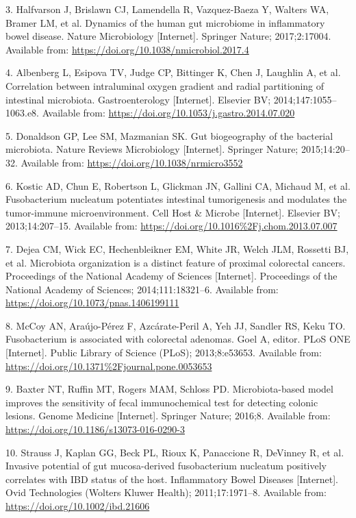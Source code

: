 \documentclass[12pt,]{article}
\begin{document}
\hypertarget{ref-Halfvarson2017}{}
3. Halfvarson J, Brislawn CJ, Lamendella R, Vazquez-Baeza Y, Walters WA,
Bramer LM, et al. Dynamics of the human gut microbiome in inflammatory
bowel disease. Nature Microbiology {[}Internet{]}. Springer Nature;
2017;2:17004. Available from:
\url{https://doi.org/10.1038/nmicrobiol.2017.4}

\hypertarget{ref-Albenberg2014}{}
4. Albenberg L, Esipova TV, Judge CP, Bittinger K, Chen J, Laughlin A,
et al. Correlation between intraluminal oxygen gradient and radial
partitioning of intestinal microbiota. Gastroenterology {[}Internet{]}.
Elsevier BV; 2014;147:1055--1063.e8. Available from:
\url{https://doi.org/10.1053/j.gastro.2014.07.020}

\hypertarget{ref-Donaldson2015}{}
5. Donaldson GP, Lee SM, Mazmanian SK. Gut biogeography of the bacterial
microbiota. Nature Reviews Microbiology {[}Internet{]}. Springer Nature;
2015;14:20--32. Available from:
\url{https://doi.org/10.1038/nrmicro3552}

\hypertarget{ref-Kostic_2013}{}
6. Kostic AD, Chun E, Robertson L, Glickman JN, Gallini CA, Michaud M,
et al. Fusobacterium nucleatum potentiates intestinal tumorigenesis and
modulates the tumor-immune microenvironment. Cell Host \& Microbe
{[}Internet{]}. Elsevier BV; 2013;14:207--15. Available from:
\url{https://doi.org/10.1016\%2Fj.chom.2013.07.007}

\hypertarget{ref-Dejea2014}{}
7. Dejea CM, Wick EC, Hechenbleikner EM, White JR, Welch JLM, Rossetti
BJ, et al. Microbiota organization is a distinct feature of proximal
colorectal cancers. Proceedings of the National Academy of Sciences
{[}Internet{]}. Proceedings of the National Academy of Sciences;
2014;111:18321--6. Available from:
\url{https://doi.org/10.1073/pnas.1406199111}

\hypertarget{ref-McCoy_2013}{}
8. McCoy AN, Araújo-Pérez F, Azcárate-Peril A, Yeh JJ, Sandler RS, Keku
TO. Fusobacterium is associated with colorectal adenomas. Goel A,
editor. PLoS ONE {[}Internet{]}. Public Library of Science (PLoS);
2013;8:e53653. Available from:
\url{https://doi.org/10.1371\%2Fjournal.pone.0053653}

\hypertarget{ref-Baxter2016}{}
9. Baxter NT, Ruffin MT, Rogers MAM, Schloss PD. Microbiota-based model
improves the sensitivity of fecal immunochemical test for detecting
colonic lesions. Genome Medicine {[}Internet{]}. Springer Nature;
2016;8. Available from: \url{https://doi.org/10.1186/s13073-016-0290-3}

\hypertarget{ref-Strauss2011}{}
10. Strauss J, Kaplan GG, Beck PL, Rioux K, Panaccione R, DeVinney R, et
al. Invasive potential of gut mucosa-derived fusobacterium nucleatum
positively correlates with IBD status of the host. Inflammatory Bowel
Diseases {[}Internet{]}. Ovid Technologies (Wolters Kluwer Health);
2011;17:1971--8. Available from: \url{https://doi.org/10.1002/ibd.21606}
\end{document}
